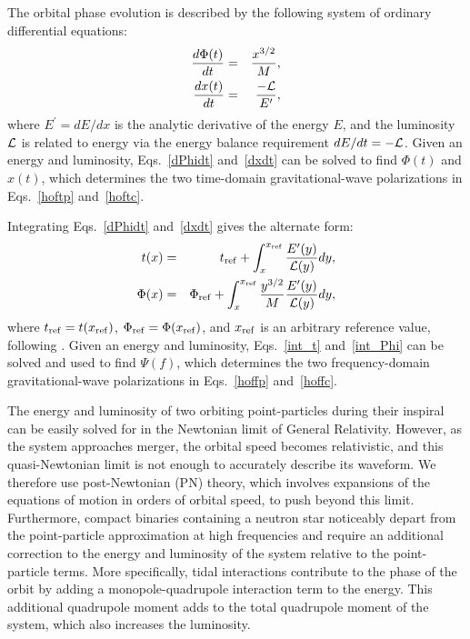 \documentclass[twocolumn,prd,amssymb,aps,nofootinbib,showpacs,epsf]{revtex4}
\begin{document}
The orbital phase evolution is described by the following system of ordinary differential equations:
\begin{eqnarray}
\label{dPhidt}
\frac{d\Phi(t)}{dt}&=&\frac{x^{3/2}}{M},\\
\label{dxdt}
\frac{d x(t)}{dt}&=&\frac{-{\cal L}}{E^{\prime}},
\end{eqnarray}
where $E^{\prime}=dE/dx$ is the analytic derivative of the energy $E$, and the luminosity ${\cal L}$ is related to energy via the energy balance requirement $dE/dt=-{\cal L}$.  Given an energy and luminosity, Eqs.~\eqref{dPhidt} and~\eqref{dxdt} can be solved to find $\Phi(t)$ and $x(t)$, which determines the two time-domain gravitational-wave polarizations in Eqs.~\eqref{hoftp} and~\eqref{hoftc}.

Integrating Eqs.~\eqref{dPhidt} and~\eqref{dxdt} gives the alternate form:
\begin{eqnarray}
\label{int_t}
t(x)&=&t_{\rm ref}+\int_x^{x_{\rm ref}}\frac{E^\prime(y)}{{\cal L}(y)}dy,\\
\label{int_Phi}
\Phi(x)&=&\Phi_{\rm ref}+\int_x^{x_{\rm ref}}\frac{y^{3/2}}{M}\frac{E^\prime(y)}{{\cal L}(y)}dy,
\end{eqnarray}
where $t_{\rm ref}=t(x_{\rm ref})$, $\Phi_{\rm ref}=\Phi(x_{\rm ref})$, and $x_{\rm ref}$ is an arbitrary reference value, following \cite{BuonannoIyerOchsner2009}.  Given an energy and luminosity, Eqs.~\eqref{int_t} and~\eqref{int_Phi} can be solved and used to find $\Psi(f)$, which determines the two frequency-domain gravitational-wave polarizations in Eqs.~\eqref{hoffp} and~\eqref{hoffc}.

The energy and luminosity of two orbiting point-particles during their inspiral can be easily solved for in the Newtonian limit of General Relativity.  However, as the system approaches merger, the orbital speed becomes relativistic, and this quasi-Newtonian limit is not enough to accurately describe its waveform.  We therefore use post-Newtonian (PN) theory, which involves expansions of the equations of motion in orders of orbital speed, to push beyond this limit.  Furthermore, compact binaries containing a neutron star noticeably depart from the point-particle approximation at high frequencies and require an additional correction to the energy and luminosity of the system relative to the point-particle terms.  More specifically, tidal interactions contribute to the phase of the orbit by adding a monopole-quadrupole interaction term to the energy.  This additional quadrupole moment adds to the total quadrupole moment of the system, which also increases the luminosity.
\end{document}

